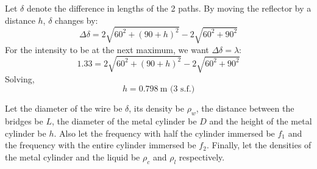 \begin{solution}
    \begin{subsolution}
        Let $\delta$ denote the difference in lengths of the 2 paths. By moving the reflector by a distance $h$, $\delta$ changes by:
        \[\Delta\delta=2\sqrt{60^2+(90+h)^2}-2\sqrt{60^2+90^2}\]
        For the intensity to be at the next maximum, we want \(\Delta\delta=\lambda\):
        \[1.33=2\sqrt{60^2+(90+h)^2}-2\sqrt{60^2+90^2}\]
        Solving,
        \[h=\boxed{\qty{0.798}{\m}}\text{ (3 s.f.)}\]
    \end{subsolution}
    \begin{subsolution}
        Let the diameter of the wire be $\delta$, its density be $\rho_w$, the distance between the bridges be $L$, the diameter of the metal cylinder be $D$ and the height of the metal cylinder be $h$. Also let the frequency with half the cylinder immersed be $f_1$ and the frequency with the entire cylinder immersed be $f_2$. Finally, let the densities of the metal cylinder and the liquid be $\rho_c$ and $\rho_l$ respectively.


\end{subsolution}
\end{solution}
